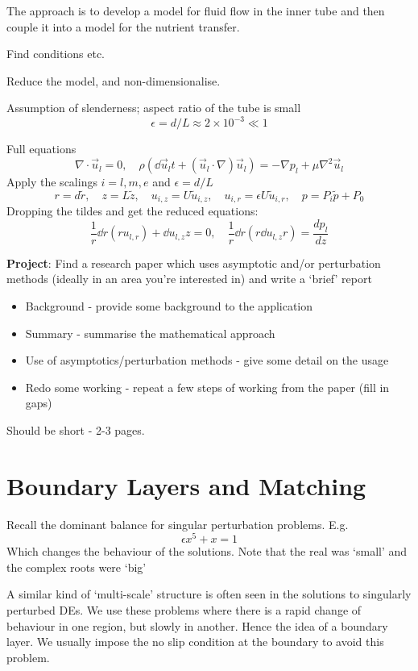 \documentclass{/home/janmebows/Documents/LatexTemplates/myassignment}
\begin{document}
The approach is to develop a model for fluid flow in the inner tube and then couple it into a model for the nutrient transfer.

Find conditions etc.

Reduce the model, and non-dimensionalise.

Assumption of slenderness; aspect ratio of the tube is small
\[\epsilon = d/L \approx 2 \times 10^{-3} \ll 1\]

Full equations
    \[\nabla \cdot \vec u_l = 0, \quad \rho \left(\dd{\vec u_l}t + (\vec u_l \cdot \nabla )\vec u_l\right) = -\nabla p_l + \mu \nabla^2 \vec u_l\]
Apply the scalings $i = l,m,e$ and $\epsilon = d/L$
\[r = d\tilde{r}, \quad z= L \tilde{z}, \quad u_{i,z} = U \tilde{u}_{i,z},\quad u_{i,r} = \epsilon U \tilde{u}_{i,r}, \quad p = P_i \tilde{p} + P_0\]
Dropping the tildes and get the reduced equations:
\[\frac1r \dd{}r(r u_{l,r}) + \dd{u_{l,z}}{z}=0, \quad \frac1r \dd{}r(r \dd{u_{l,z}}r) = \frac{dp_l}{dz}\]




\textbf{Project}: 
Find a research paper which uses asymptotic and/or perturbation methods (ideally in an area you're interested in) and write a `brief' report
\begin{itemize}
    \item Background - provide some background to the application
    \item Summary - summarise the mathematical approach
    \item Use of asymptotics/perturbation methods - give some detail on the usage
    \item Redo some working - repeat a few steps of working from the paper (fill in gaps)
\end{itemize}
Should be short - 2-3 pages.




\section{Boundary Layers and Matching}
Recall the dominant balance for singular perturbation problems. E.g.
\[\epsilon x^5 + x =1\]
Which changes the behaviour of the solutions. Note that the real was `small' and the complex roots were `big'


A similar kind of `multi-scale' structure is often seen in the solutions to singularly perturbed DEs. We use these problems where there is a rapid change of behaviour in one region, but slowly in another. Hence the idea of a boundary layer. We usually impose the no slip condition at the boundary to avoid this problem.
\end{document}

